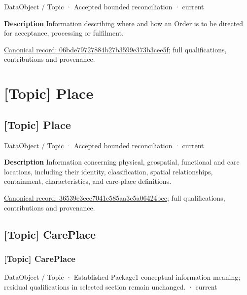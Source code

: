 \label{element:06bde79727884b27b3599e373b3cee5f}
{\small DataObject / Topic · Accepted bounded reconciliation · current}\par

\textbf{Description}
Information describing where and how an Order is to be directed for acceptance, processing or fulfilment.


{\footnotesize \href{../../../../continuum/application/data-object/topic/06bde79727884b27b3599e373b3cee5f.md}{Canonical record: 06bde79727884b27b3599e373b3cee5f}; full qualifications, contributions and provenance.}\par
\section{[Topic] Place}

\subsection{[Topic] Place}

\label{element:36539e3eee7041e585aa3c5a06424bcc}
{\small DataObject / Topic · Accepted bounded reconciliation · current}\par

\textbf{Description}
Information concerning physical, geospatial, functional and care locations, including their identity, classification, spatial relationships, containment, characteristics, and care-place definitions.


{\footnotesize \href{../../../../continuum/application/data-object/topic/36539e3eee7041e585aa3c5a06424bcc.md}{Canonical record: 36539e3eee7041e585aa3c5a06424bcc}; full qualifications, contributions and provenance.}\par
\subsection{[Topic] CarePlace}

\subsubsection{[Topic] CarePlace}

\label{element:779f2295b0b648dda9dbd21c4ade3ba0}
{\small DataObject / Topic · Established Package1 conceptual information meaning; residual qualifications in selected section remain unchanged. · current}\par

